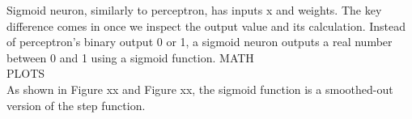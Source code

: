 Sigmoid neuron, similarly to perceptron, has inputs x and weights. The key difference comes in once we inspect the output value and its calculation.
 Instead of perceptron's binary output 0 or 1, a sigmoid neuron outputs a real number between 0 and 1 using a sigmoid function.  \newline
MATH\\
PLOTS\\

As shown in Figure xx and Figure xx, the sigmoid function is a smoothed-out version of the step function.\\